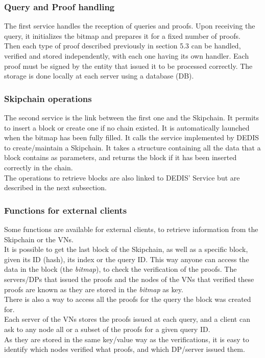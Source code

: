 \documentclass{article}
\begin{document}
\subsubsection{Query and Proof handling}
The first service handles the reception of queries and proofs.
Upon receiving the query, it initializes the bitmap and prepares it for a fixed number of proofs.\\
Then each type of proof described previously in section 5.3 can be handled, verified and stored independently, with each one having its own handler. Each proof must be signed by the entity that issued it to be processed correctly. The storage is done locally at each server using a database (DB).

\subsubsection{Skipchain operations}
The second service is the link between the first one and the Skipchain. It permits to insert a block or create one if no chain existed. It is automatically launched when the bitmap has been fully filled. It calls the service implemented by DEDIS to create/maintain a Skipchain. It takes a structure containing all the data that a block contains as parameters, and returns the block if it has been inserted correctly in the chain.\\
The operations to retrieve blocks are also linked to DEDIS' Service but are described in the next subsection.

\subsubsection{Functions for external clients}
Some functions are available for external clients, to retrieve information from the Skipchain or the VNs.\\
It is possible to get the last block of the Skipchain, as well as a specific block, given its ID (hash), its index or the query ID. This way anyone can access the data in the block (the \textit{bitmap}), to check the verification of the proofs. The servers/DPs that issued the proofs and the nodes of the VNs that verified these proofs are known as they are stored in the \textit{bitmap} as key.\\

There is also a way to access all the proofs for the query the block was created for.\\
Each server of the VNs stores the proofs issued at each query, and a client can ask to any node all or a subset of the proofs for a given query ID.\\
As they are stored in the same key/value way as the verifications, it is easy to identify which nodes verified what proofs, and which DP/server issued them.
\end{document}
